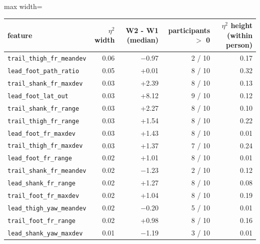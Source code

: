 \begin{adjustbox}{max width=\textwidth}
{\footnotesize
\begin{tabular}{lrrrr}
\toprule
\textbf{feature} & \textbf{$\eta^2$ width} & \textbf{W2 - W1 (median)} & \textbf{participants $>$ 0} & \textbf{$\eta^2$ height (within person)} \\
\midrule
\texttt{trail\_\allowbreak{}thigh\_\allowbreak{}fr\_\allowbreak{}meandev} & 0.06 & $-$0.97 & 2 / 10 & 0.17 \\
\texttt{lead\_\allowbreak{}foot\_\allowbreak{}path\_\allowbreak{}ratio} & 0.05 & +0.01 & 8 / 10 & 0.32 \\
\texttt{trail\_\allowbreak{}shank\_\allowbreak{}fr\_\allowbreak{}maxdev} & 0.03 & +2.39 & 8 / 10 & 0.13 \\
\texttt{lead\_\allowbreak{}foot\_\allowbreak{}lat\_\allowbreak{}out} & 0.03 & +8.12 & 9 / 10 & 0.12 \\
\texttt{trail\_\allowbreak{}shank\_\allowbreak{}fr\_\allowbreak{}range} & 0.03 & +2.27 & 8 / 10 & 0.10 \\
\texttt{trail\_\allowbreak{}thigh\_\allowbreak{}fr\_\allowbreak{}range} & 0.03 & +1.54 & 8 / 10 & 0.22 \\
\texttt{lead\_\allowbreak{}foot\_\allowbreak{}fr\_\allowbreak{}maxdev} & 0.03 & +1.43 & 8 / 10 & 0.01 \\
\texttt{trail\_\allowbreak{}thigh\_\allowbreak{}fr\_\allowbreak{}maxdev} & 0.03 & +1.37 & 7 / 10 & 0.24 \\
\texttt{lead\_\allowbreak{}foot\_\allowbreak{}fr\_\allowbreak{}range} & 0.02 & +1.01 & 8 / 10 & 0.01 \\
\texttt{trail\_\allowbreak{}shank\_\allowbreak{}fr\_\allowbreak{}meandev} & 0.02 & $-$1.23 & 2 / 10 & 0.12 \\
\texttt{lead\_\allowbreak{}shank\_\allowbreak{}fr\_\allowbreak{}range} & 0.02 & +1.27 & 8 / 10 & 0.08 \\
\texttt{trail\_\allowbreak{}foot\_\allowbreak{}fr\_\allowbreak{}maxdev} & 0.02 & +1.04 & 8 / 10 & 0.19 \\
\texttt{lead\_\allowbreak{}thigh\_\allowbreak{}yaw\_\allowbreak{}meandev} & 0.02 & $-$0.20 & 5 / 10 & 0.01 \\
\texttt{trail\_\allowbreak{}foot\_\allowbreak{}fr\_\allowbreak{}range} & 0.02 & +0.98 & 8 / 10 & 0.16 \\
\texttt{lead\_\allowbreak{}shank\_\allowbreak{}yaw\_\allowbreak{}maxdev} & 0.01 & $-$1.19 & 3 / 10 & 0.01 \\
\bottomrule
\end{tabular}
}
\end{adjustbox}
